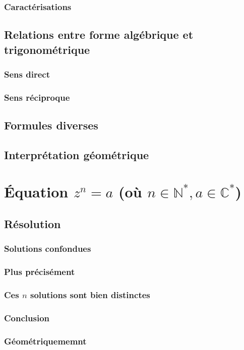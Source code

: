 \documentclass[12pt,a4paper,french]{book}
\begin{document}
			\subsubsection{Caractérisations}
		\subsection{Relations entre forme algébrique et trigonométrique}
			\subsubsection{Sens direct}
			\subsubsection{Sens réciproque}
		\subsection{Formules diverses}
		\subsection{Interprétation géométrique}
	\section{Équation $z^{n}=a$ (où $n\in \mathbb{N}^{\ast},a\in \mathbb{C}^{\ast}$)}
		\subsection{Résolution}
			\subsubsection{Solutions confondues}
			\subsubsection{Plus précisément}
			\subsubsection{Ces $n$ solutions sont bien distinctes}
			\subsubsection{Conclusion}
			\subsubsection{Géométriquememnt}
\end{document}
